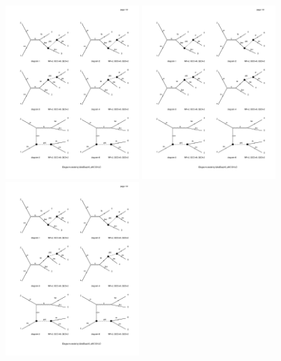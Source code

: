 \begin{figure}[h]
    \centering
    \includegraphics[width=0.45\textwidth,clip=true,viewport=65 550 315 730,page=1]{Figures/madgraph_diagrams/ee_tautauee_scalar.pdf}
    \includegraphics[width=0.45\textwidth,clip=true,viewport=65 340 315 520,page=1]{Figures/madgraph_diagrams/ee_tautauee_scalar.pdf}
    \includegraphics[width=0.45\textwidth,clip=true,viewport=65 110 315 310,page=1]{Figures/madgraph_diagrams/ee_tautauee_scalar.pdf}

\end{figure}
